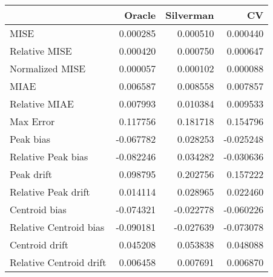 \begin{tabular}{lrrr}
  \hline
 & Oracle & Silverman & CV \\ 
  \hline
MISE & 0.000285 & 0.000510 & 0.000440 \\ 
  Relative MISE & 0.000420 & 0.000750 & 0.000647 \\ 
  Normalized MISE & 0.000057 & 0.000102 & 0.000088 \\ 
  MIAE & 0.006587 & 0.008558 & 0.007857 \\ 
  Relative MIAE & 0.007993 & 0.010384 & 0.009533 \\ 
  Max Error & 0.117756 & 0.181718 & 0.154796 \\ 
  Peak bias & -0.067782 & 0.028253 & -0.025248 \\ 
  Relative Peak bias & -0.082246 & 0.034282 & -0.030636 \\ 
  Peak drift & 0.098795 & 0.202756 & 0.157222 \\ 
  Relative Peak drift & 0.014114 & 0.028965 & 0.022460 \\ 
  Centroid bias & -0.074321 & -0.022778 & -0.060226 \\ 
  Relative Centroid bias & -0.090181 & -0.027639 & -0.073078 \\ 
  Centroid drift & 0.045208 & 0.053838 & 0.048088 \\ 
  Relative Centroid drift & 0.006458 & 0.007691 & 0.006870 \\ 
   \hline
\end{tabular}
